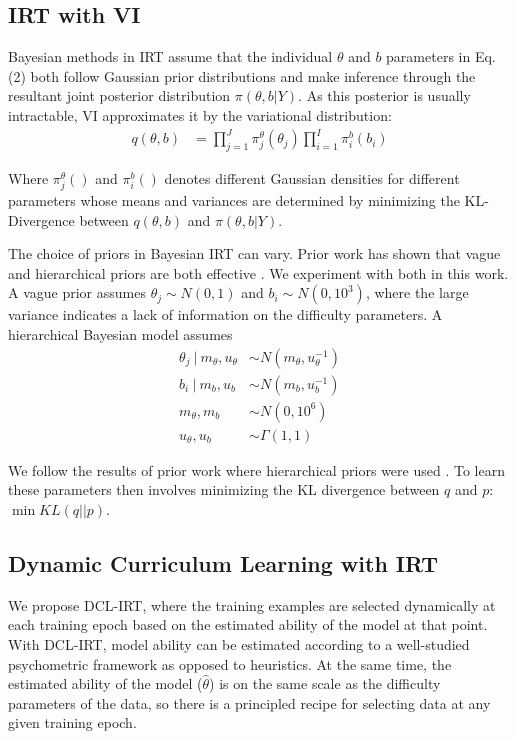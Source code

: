 \documentclass[letterpaper]{article} %
\begin{document}


\subsection{IRT with VI} 
Bayesian methods in IRT assume that the individual $\theta$ and $b$ parameters in Eq. (2) both follow Gaussian prior distributions and make inference through the resultant joint posterior distribution $\pi(\theta,b|Y)$. As this posterior is usually intractable, VI approximates it by the variational distribution:
\begin{align} 
q(\theta, b) &=  \prod_{j=1}^J \pi^\theta_j(\theta_j) \prod_{i=1}^I \pi^b_i(b_i)
\end{align} 

Where $\pi^\theta_j()$ and $\pi^b_i()$ denotes different Gaussian densities for different parameters whose means and variances are determined by minimizing the KL-Divergence between $q(\theta,b)$ and $\pi(\theta,b|Y)$.

The choice of priors in Bayesian IRT can vary.
Prior work has shown that vague and hierarchical priors are both effective \cite{natesan_bayesian_2016}.
We experiment with both in this work. A vague prior assumes $\theta_j \sim N(0, 1)$ and $b_i \sim N(0, 10^3)$, where the large variance indicates a lack of information on the difficulty parameters.
A hierarchical Bayesian model assumes
\begin{align*}
\theta_j\ |\ m_\theta, u_\theta &\sim N(m_{\theta}, u^{-1}_{\theta}) \\
b_i\ |\ m_b, u_b &\sim N(m_b, u^{-1}_b) \\
m_{\theta}, m_{b} &\sim N(0, 10^6) \\
u_{\theta}, u_b &\sim \Gamma(1, 1)
\end{align*}

We follow the results of prior work where hierarchical priors were used \cite{lalor_learning_2019}.
To learn these parameters then involves minimizing the KL divergence between $q$ and $p$: $\min KL(q \vert \vert p)$. 


\subsection{Dynamic Curriculum Learning with IRT}

We propose DCL-IRT, where the training examples are selected dynamically at each training epoch based on the estimated ability of the model at that point.
With DCL-IRT, model ability can be estimated according to a well-studied psychometric framework as opposed to heuristics.
At the same time, the estimated ability of the model ($\hat{\theta}$) is on the same scale as the difficulty parameters of the data, so there is a principled recipe for selecting data at any given training epoch.
\end{document}
